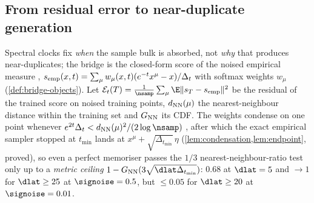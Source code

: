 \subsection{From residual error to near-duplicate generation}
\label{sec:theory-bridge}\label{sec:theory-fraction}\label{sec:theory-mem}

Spectral clocks fix \emph{when} the sample bulk is absorbed, not \emph{why} that produces near-duplicates; the bridge is the closed-form score of the noised empirical measure \citep{scarvelis2023closedform,gu2023memorization}, $s_{\rm emp}(x,t)=\sum_\mu w_\mu(x,t)(e^{-t}x^\mu-x)/\Delta_t$ with softmax weights $w_\mu$ (\cref{def:bridge-objects}). Let $\mathcal E_t(T)=\tfrac1\nsamp\sum_\mu\E\|s_T-s_{\rm emp}\|^2$ be the residual of the trained score on noised training points, $d_{\rm NN}(\mu)$ the nearest-neighbour distance within the training set and $G_{\rm NN}$ its CDF. The weights condense on one point whenever $e^{2t}\Delta_t<d_{\rm NN}(\mu)^2/(2\log\nsamp)$ \citep{biroli2024dynamical}, after which the exact empirical sampler stopped at $t_{\min}$ lands at $x^\mu+\sqrt{\Delta_{t_{\min}}}\,\eta$ (\cref{lem:condensation,lem:endpoint}, proved), so even a perfect memoriser passes the $1/3$ nearest-neighbour-ratio test \citep{somepalli2023diffusion} only up to a \emph{metric ceiling} $1-G_{\rm NN}(3\sqrt{\dlat\Delta_{t_{\min}}})$: $0.68$ at $\dlat=5$ and $\to1$ for $\dlat\ge25$ at $\signoise=0.5$, but $\le0.05$ for $\dlat\ge20$ at $\signoise=0.01$.

